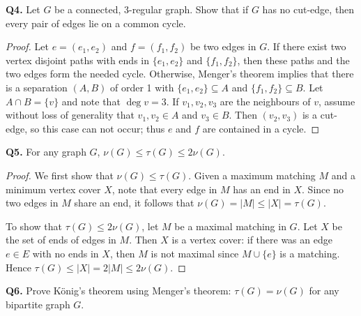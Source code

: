 \noindent \textbf{Q4.} Let \( G \) be a connected, 3-regular graph. Show that if \( G \) has no cut-edge, then every pair of edges lie on a common cycle.
\begin{proof}
Let \( e = (e_1, e_2) \) and \( f = (f_1, f_2) \) be two edges in \( G \). If there exist two vertex disjoint paths with ends in \( \{ e_1, e_2 \}  \) and \( \{ f_1, f_2 \}  \), then these paths and the two edges form the needed cycle. Otherwise, Menger's theorem implies that there is a separation \( (A,B) \) of order 1 with \( \{ e_1, e_2 \} \subseteq A \) and \( \{ f_1, f_2 \} \subseteq B \). Let \( A \cap B = \{ v \}  \) and note that \( \deg v = 3 \). If \( v_1, v_2, v_3 \) are the neighbours of \( v \), assume without loss of generality that \( v_1, v_2 \in A \) and \( v_3 \in B \). Then \( (v_2, v_3) \) is a cut-edge, so this case can not occur; thus \( e \) and \( f \) are contained in a cycle.
\end{proof}
\noindent \textbf{Q5.} For any graph \( G \), \( \nu (G) \leq \tau (G) \leq 2 \nu (G) \).
\begin{proof}
We first show that \( \nu (G) \leq \tau (G) \). Given a maximum matching \( M \) and a minimum vertex cover \( X \), note that every edge in \( M \) has an end in \( X \). Since no two edges in \( M \) share an end, it follows that \(\nu (G) = |M| \leq |X| = \tau (G) \).

To show that \( \tau (G) \leq 2 \nu (G) \), let \( M \) be a maximal matching in \( G \). Let \( X \) be the set of ends of edges in \( M \). Then \( X \) is a vertex cover: if there was an edge \( e \in E \) with no ends in \( X \), then \( M \) is not maximal since \( M \cup \{ e \}  \) is a matching. Hence \( \tau (G) \leq |X| = 2 |M| \leq 2 \nu (G) \).
\end{proof}
\noindent \textbf{Q6.} Prove K\"onig's theorem using Menger's theorem: \( \tau (G) = \nu (G) \) for any bipartite graph \( G \).

